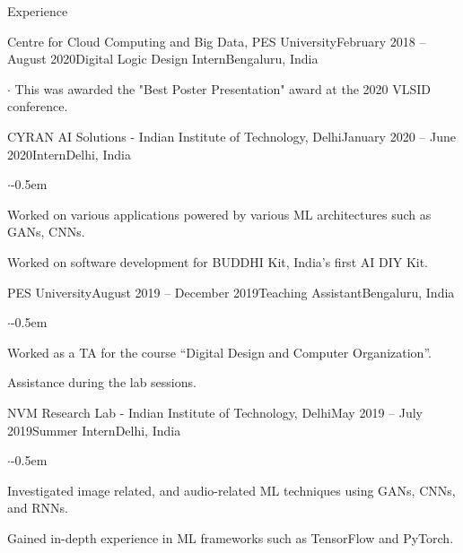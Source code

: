 \documentclass{CV} %
\begin{document}
\begin{rSection}{Experience}
\begin{rSubsection}{Centre for Cloud Computing and Big Data, PES University}{February 2018 -- August 2020}{Digital Logic Design Intern}{Bengaluru, India}
\begin{list}{$\cdot$}{\footnotesize}
      This was awarded the "Best Poster Presentation" award at the 2020 VLSID conference.
    \end{list}
  \end{rSubsection}
  
  \begin{rSubsection}{CYRAN AI Solutions - Indian Institute of Technology, Delhi}{January 2020 -- June 2020}{Intern}{Delhi, India}
    \begin{list}{$\cdot$}{\footnotesize}\itemsep -0.5em \vspace{-0.5em}
      \item Worked on various applications powered by various ML architectures such as GANs, CNNs.
      \item Worked on software development for BUDDHI Kit, India’s first AI DIY Kit.
    \end{list}
  \end{rSubsection}

  \begin{rSubsection}{PES University}{August 2019 -- December 2019}{Teaching Assistant}{Bengaluru, India}
    \begin{list}{$\cdot$}{\footnotesize}\itemsep -0.5em \vspace{-0.5em}
      \item Worked as a TA for the course ``Digital Design and Computer Organization''.
      \item Assistance during the lab sessions.
    \end{list}
  \end{rSubsection}

  \begin{rSubsection}{NVM Research Lab - Indian Institute of Technology, Delhi}{May 2019 -- July 2019}{Summer Intern}{Delhi, India}
    \begin{list}{$\cdot$}{\footnotesize}\itemsep -0.5em \vspace{-0.5em}
      \item Investigated image related, and audio-related ML techniques using GANs, CNNs, and RNNs.
      \item Gained in-depth experience in ML frameworks such as TensorFlow and PyTorch.
    \end{list}
  \end{rSubsection}


\end{rSection}
\end{document}
